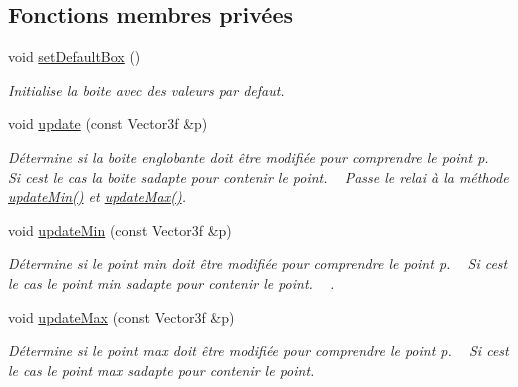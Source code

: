 \subsection*{Fonctions membres privées}
\begin{DoxyCompactItemize}
\item 
\hypertarget{class_box_a411b56ce2f6a9c29e83ce8c16d99adae}{}void \hyperlink{class_box_a411b56ce2f6a9c29e83ce8c16d99adae}{set\+Default\+Box} ()\label{class_box_a411b56ce2f6a9c29e83ce8c16d99adae}

\begin{DoxyCompactList}\small\item\em Initialise la boite avec des valeurs par defaut. \end{DoxyCompactList}\item 
void \hyperlink{class_box_a13162f123f21923c3b22ba02a2211143}{update} (const Vector3f \&p)
\begin{DoxyCompactList}\small\item\em Détermine si la boite englobante doit être modifiée pour comprendre le point {\itshape p}. ~\newline
Si c\textquotesingle{}est le cas la boite s\textquotesingle{}adapte pour contenir le point. ~\newline
Passe le relai à la méthode \hyperlink{class_box_a3aafcee14e1e0ea4a6fe1b61d463fbd5}{update\+Min()} et \hyperlink{class_box_ab637f4c06fd3359557445917f18d4f1f}{update\+Max()}. \end{DoxyCompactList}\item 
void \hyperlink{class_box_a3aafcee14e1e0ea4a6fe1b61d463fbd5}{update\+Min} (const Vector3f \&p)
\begin{DoxyCompactList}\small\item\em Détermine si le point min doit être modifiée pour comprendre le point {\itshape p}. ~\newline
Si c\textquotesingle{}est le cas le point min s\textquotesingle{}adapte pour contenir le point. ~\newline
. \end{DoxyCompactList}\item 
void \hyperlink{class_box_ab637f4c06fd3359557445917f18d4f1f}{update\+Max} (const Vector3f \&p)
\begin{DoxyCompactList}\small\item\em Détermine si le point max doit être modifiée pour comprendre le point {\itshape p}. ~\newline
Si c\textquotesingle{}est le cas le point max s\textquotesingle{}adapte pour contenir le point. ~\newline

\end{DoxyCompactList}
\end{DoxyCompactItemize}
